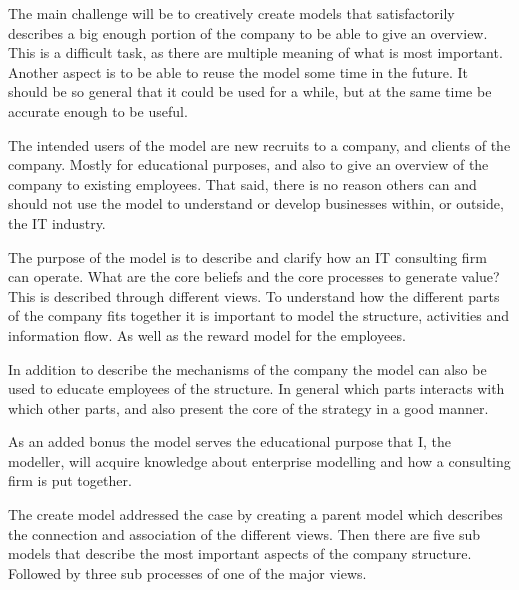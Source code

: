 \documentclass[12pt, a4paper]{article}
\begin{document}
The main challenge will be to creatively create models that satisfactorily
describes a big enough portion of the company to be able to give an overview.
This is a difficult task, as there are multiple meaning of what is most
important. Another aspect is to be able to reuse the model some time in the
future. It should be so general that it could be used for a while, but at the
same time be accurate enough to be useful. 

The intended users of the model are new recruits to a company, and clients of
the company. Mostly for educational purposes, and also to give an overview of
the company to existing employees. That said, there is no reason others can and
should not use the model to understand or develop businesses within, or
outside, the IT industry.


The purpose of the model is to describe and clarify how an IT consulting firm
can operate. What are the core beliefs and the core processes to generate
value? This is described through different views. To understand how the
different parts of the company fits together it is important to model the
structure, activities and information flow. As well as the reward model for the
employees.    

In addition to describe the mechanisms of the company the model can also be
used to educate employees of the structure. In general which parts interacts
with which other parts, and also present the core of the strategy in a good
manner. 

As an added bonus the model serves the educational purpose that I, the modeller,
will acquire knowledge about enterprise modelling and how a consulting firm
is put together. 

The create model addressed the case by creating a parent model which describes
the connection and association of the different views. Then there are five sub
models that describe the most important aspects of the company structure.
Followed by three sub processes of one of the major views.  
\end{document}
